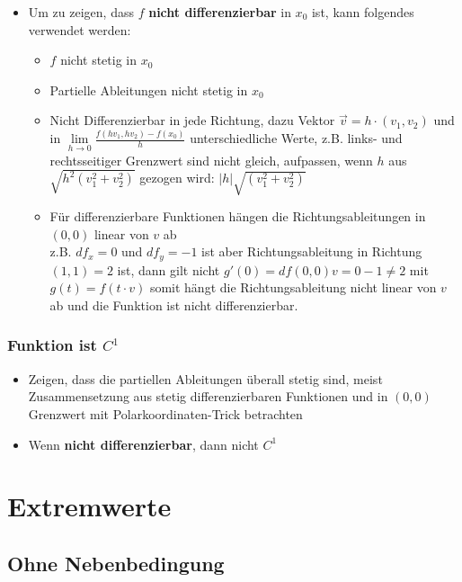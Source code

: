 \documentclass[a3paper, 11pt, landscape]{scrartcl}
\begin{document}
\begin{multicols*}{3}
\begin{enumerate}
	    \begin{itemize}
	        \item Um zu zeigen, dass $f$ \textbf{nicht differenzierbar} in $x_0$ ist, kann folgendes verwendet werden:
	        \begin{itemize}
	            \item $f$ nicht stetig in $x_0$
	            \item Partielle Ableitungen nicht stetig in $x_0$
	            \item Nicht Differenzierbar in jede Richtung, dazu Vektor $\vec{v} = h\cdot(v_1,v_2)$ und in $\lim\limits_{h\to 0} \frac{f(h v_1,h v_2)-f(x_0)}{h}$ unterschiedliche Werte, z.B. links- und rechtsseitiger Grenzwert sind nicht gleich, aufpassen, wenn $h$ aus $\sqrt{h^2(v_1^2+v_2^2)}$ gezogen wird: $|h|\sqrt{(v_1^2+v_2^2)}$
	            \item Für differenzierbare Funktionen hängen die Richtungsableitungen in $(0,0)$ linear von $v$ ab\\
	            z.B. $df_x = 0$ und $df_y=-1$ ist aber Richtungsableitung in Richtung $(1,1)= 2$ ist, dann gilt nicht $g'(0)=df(0,0) v = 0 - 1\neq 2$ mit $g(t)=f(t\cdot v)$ somit hängt die Richtungsableitung nicht linear von $v$ ab und die Funktion ist nicht differenzierbar.
	        \end{itemize}
	    \end{itemize}
	\end{enumerate}
	
	\subsubsection{Funktion ist $C^1$}
	\begin{itemize}
	    \item Zeigen, dass die partiellen Ableitungen überall stetig sind, meist Zusammensetzung aus stetig differenzierbaren Funktionen und in $(0,0)$ Grenzwert mit Polarkoordinaten-Trick betrachten
	    \item Wenn \textbf{nicht differenzierbar}, dann nicht $C^1$
	\end{itemize}
	
	
	\section{Extremwerte}
		\subsection{Ohne Nebenbedingung}

\end{multicols*}
\end{document}

